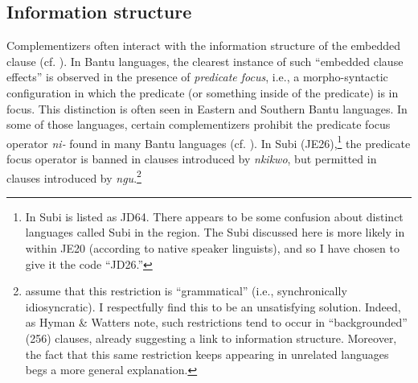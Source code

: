 \documentclass[output=paper,colorlinks,citecolor=brown,
]{langscibook}
\begin{document}
\subsection{Information structure}


Complementizers often interact with the information structure of the embedded clause (cf. \citealt{Djarv:2019}). In Bantu languages, the clearest instance of such ``embedded clause effects'' is observed in the presence of \textit{predicate focus}, i.e., a morpho-syntactic configuration in which the predicate (or something inside of the predicate) is in focus. This distinction is often seen in Eastern and Southern Bantu languages. In some of those languages, certain complementizers prohibit the predicate focus operator \textit{ni-} found in many Bantu languages \citep{Guldemann:2003, Guldemann:2013} (cf. ). In Subi (JE26),\footnote{In \citet{Maho:2009, Hammarstrom:2019} Subi is listed as JD64. There appears to be some confusion about distinct languages called Subi in the region. The Subi discussed here is more likely in within JE20 (according to native speaker linguists), and so I have chosen to give it the code ``JD26.''} the predicate focus operator is banned in clauses introduced by \textit{nkikwo}, but permitted in clauses introduced by \textit{ngu}.\footnote{\citet{HymanWatters:1984} assume that this restriction is ``grammatical'' (i.e., synchronically idiosyncratic). I respectfully find this to be an unsatisfying solution. Indeed, as Hyman \& Watters note, such restrictions tend to occur in ``backgrounded'' (256) clauses, already suggesting a link to information structure. Moreover, the fact that this same restriction keeps appearing in unrelated languages begs a more general explanation.} 
\end{document}
